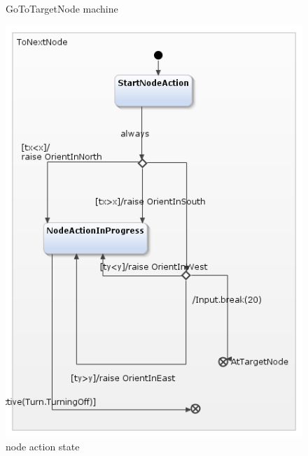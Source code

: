 \documentclass[a4paper,12pt,oneside]{book}
\begin{document}
\begin{itemize}
\begin{figure}[]
\begin{minipage}{0.45\textwidth}
	\caption{GoToTargetNode machine}
	\label{GoToTargetNode}
\end{minipage}
\end{figure}
\begin{figure}[]
	\centering
	\includegraphics[scale=.6]{node_action.png}
	\caption{node action state}
	\label{node_action}
\end{figure}


\end{itemize}
\end{document}
